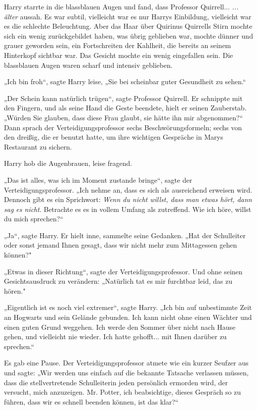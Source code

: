 {Harry starrte in die blassblauen Augen und fand, dass Professor Quirrell... \emph{... älter} aussah. Es war subtil, vielleicht war es nur Harrys Einbildung, vielleicht war es die schlechte Beleuchtung. Aber das Haar über Quirinus Quirrells Stirn mochte sich ein wenig zurückgebildet haben, was übrig geblieben war, mochte dünner und grauer geworden sein, ein Fortschreiten der Kahlheit, die bereits an seinem Hinterkopf sichtbar war. Das Gesicht mochte ein wenig eingefallen sein. Die blassblauen Augen waren scharf und intensiv geblieben.

„Ich bin froh“, sagte Harry leise, „Sie bei scheinbar guter Gesundheit zu sehen.“

„Der Schein kann natürlich trügen“, sagte Professor Quirrell. Er schnippte mit den Fingern, und als seine Hand die Geste beendete, hielt er seinen Zauberstab. „Würden Sie glauben, dass diese Frau glaubt, sie hätte ihn mir abgenommen?“ Dann sprach der Verteidigungsprofessor sechs Beschwörungsformeln; sechs von den dreißig, die er benutzt hatte, um ihre wichtigen Gespräche in Marys Restaurant zu sichern.

Harry hob die Augenbrauen, leise fragend.

„Das ist alles, was ich im Moment zustande bringe“, sagte der Verteidigungsprofessor. „Ich nehme an, dass es sich als ausreichend erweisen wird. Dennoch gibt es ein Sprichwort: \emph{Wenn du nicht willst, dass man etwas hört, dann sag es nicht}. Betrachte es es in vollem Umfang als zutreffend. Wie ich höre, willst du mich sprechen?“

„Ja“, sagte Harry. Er hielt inne, sammelte seine Gedanken. „Hat der Schulleiter oder sonst jemand Ihnen gesagt, dass wir nicht mehr zum Mittagessen gehen können?"

„Etwas in dieser Richtung“, sagte der Verteidigungsprofessor. Und ohne seinen Gesichtsausdruck zu verändern: „Natürlich tat es mir furchtbar leid, das zu hören."

„Eigentlich ist es noch viel extremer“, sagte Harry. „Ich bin auf unbestimmte Zeit an Hogwarts und sein Gelände gebunden. Ich kann nicht ohne einen Wächter und einen guten Grund weggehen. Ich werde den Sommer über nicht nach Hause gehen, und vielleicht nie wieder. Ich hatte gehofft... mit Ihnen darüber zu sprechen.“

Es gab eine Pause. Der Verteidigungsprofessor atmete wie ein kurzer Seufzer aus und sagte: „Wir werden uns einfach auf die bekannte Tatsache verlassen müssen, dass die stellvertretende Schulleiterin jeden persönlich ermorden wird, der versucht, mich anzuzeigen. Mr. Potter, ich beabsichtige, dieses Gespräch so zu führen, dass wir es schnell beenden können, ist das klar?“

}
